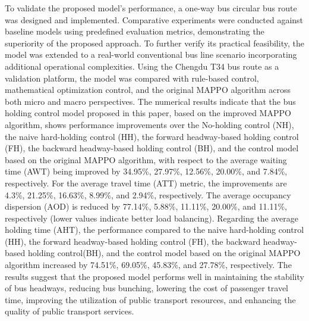 To validate the proposed model's performance, a one-way bus circular bus route was designed and implemented. 
Comparative experiments were conducted against baseline models using predefined evaluation metrics, 
demonstrating the superiority of the proposed approach. To further verify its practical feasibility, 
the model was extended to a real-world conventional bus line scenario incorporating additional operational complexities. 
Using the Chengdu T34 bus route as a validation platform, the model was compared with rule-based control, 
mathematical optimization control, and the original MAPPO algorithm across both micro and macro perspectives.
The numerical results indicate that the bus holding control model proposed in this paper, 
based on the improved MAPPO algorithm, shows performance improvements over the No-holding control (NH), 
the naive hard-holding control (HH), the forward headway-based holding control (FH), 
the backward headway-based holding control (BH), and the control model based on the original MAPPO algorithm, 
with respect to the average waiting time (AWT) being improved by 34.95\%, 27.97\%, 12.56\%, 20.00\%, and 7.84\%, 
respectively. For the average travel time (ATT) metric, the improvements are 4.3\%, 21.25\%, 16.63\%, 8.99\%, and 2.94\%, 
respectively. The average occupancy dispersion (AOD) is reduced by 
77.14\%, 5.88\%, 11.11\%, 20.00\%, and 11.11\%, respectively (lower values indicate better load balancing).
Regarding the average holding time (AHT), the performance compared to 
the naive hard-holding control (HH), the forward headway-based holding control (FH), 
the backward headway-based holding control(BH), and the control model based on the original MAPPO algorithm 
increased by 74.51\%, 69.05\%, 45.83\%, and 27.78\%, respectively. 
The results suggest that the proposed model performs well in maintaining the stability of bus headways, 
reducing bus bunching, lowering the cost of passenger travel time, improving the utilization of 
public transport resources, and enhancing the quality of public transport services.



